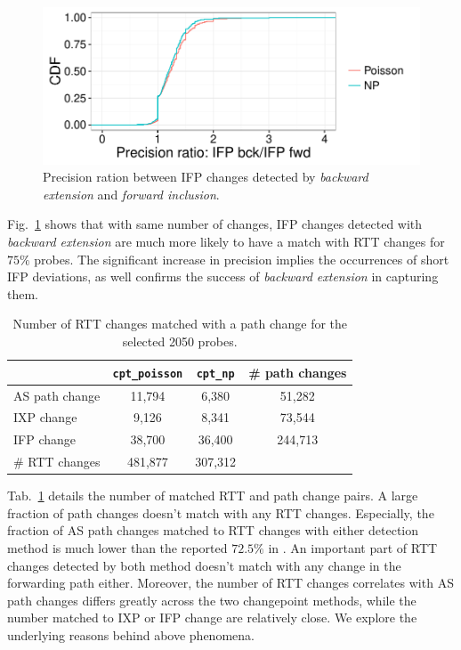 \begin{figure}[!htb]
\centering
\includegraphics[width=.72\textwidth]{gfx/chap4/ifp_bck_ch_precision_gain_cdf.pdf}
\caption{Precision ration between IFP changes detected by \textit{backward extension} and \textit{forward inclusion}.}
\label{fig:ifp_bck_ch_precision_gain_cdf}
\end{figure}
Fig.~\ref{fig:ifp_bck_ch_precision_gain_cdf} shows that with same number of changes, IFP changes detected with \textit{backward extension} are much more likely to have a match with RTT changes for $75\%$ probes.
The significant increase in precision implies the occurrences of short IFP deviations, as well confirms the success of \textit{backward extension} in capturing them.

\begin{table}[!htb]
\caption{Number of RTT changes matched with a path change for the selected 2050 probes.}
\label{tab:corr_overview}
\centering
\footnotesize
\setlength{\tabcolsep}{0.5em}
\begin{tabular}{l|cc|c}
\toprule
& \texttt{cpt\_poisson} & \texttt{cpt\_np} & \# path changes\\
\midrule
AS path change & 11,794 & 6,380 & 51,282 \\
IXP change & 9,126 & 8,341 & 73,544\\
IFP change & 38,700 & 36,400 & 244,713\\
\midrule
\# RTT changes & 481,877 & 307,312 & \\
\bottomrule
\end{tabular}
\end{table}

Tab.~\ref{tab:corr_overview} details the number of matched RTT and path change pairs.
A large fraction of path changes doesn't match with any RTT changes.
Especially, the fraction of AS path changes matched to RTT changes with either detection method is much lower than the reported $72.5\%$ in \cite{Rimondini2014}.
An important part of RTT changes detected by both method doesn't match with any change in the forwarding path either.
Moreover, the number of RTT changes correlates with AS path changes differs greatly across the two changepoint methods,
while the number matched to IXP or IFP change are relatively close.
We explore the underlying reasons behind above phenomena.

